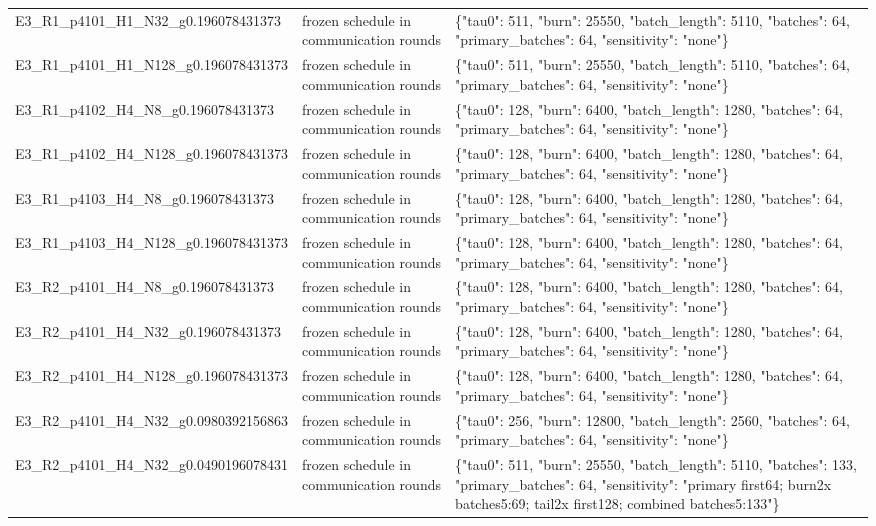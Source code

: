 \begin{tabular}{lll}
E3\_R1\_p4101\_H1\_N32\_g0.196078431373 & frozen schedule in communication rounds & \{"tau0": 511, "burn": 25550, "batch\_length": 5110, "batches": 64, "primary\_batches": 64, "sensitivity": "none"\} \\
E3\_R1\_p4101\_H1\_N128\_g0.196078431373 & frozen schedule in communication rounds & \{"tau0": 511, "burn": 25550, "batch\_length": 5110, "batches": 64, "primary\_batches": 64, "sensitivity": "none"\} \\
E3\_R1\_p4102\_H4\_N8\_g0.196078431373 & frozen schedule in communication rounds & \{"tau0": 128, "burn": 6400, "batch\_length": 1280, "batches": 64, "primary\_batches": 64, "sensitivity": "none"\} \\
E3\_R1\_p4102\_H4\_N128\_g0.196078431373 & frozen schedule in communication rounds & \{"tau0": 128, "burn": 6400, "batch\_length": 1280, "batches": 64, "primary\_batches": 64, "sensitivity": "none"\} \\
E3\_R1\_p4103\_H4\_N8\_g0.196078431373 & frozen schedule in communication rounds & \{"tau0": 128, "burn": 6400, "batch\_length": 1280, "batches": 64, "primary\_batches": 64, "sensitivity": "none"\} \\
E3\_R1\_p4103\_H4\_N128\_g0.196078431373 & frozen schedule in communication rounds & \{"tau0": 128, "burn": 6400, "batch\_length": 1280, "batches": 64, "primary\_batches": 64, "sensitivity": "none"\} \\
E3\_R2\_p4101\_H4\_N8\_g0.196078431373 & frozen schedule in communication rounds & \{"tau0": 128, "burn": 6400, "batch\_length": 1280, "batches": 64, "primary\_batches": 64, "sensitivity": "none"\} \\
E3\_R2\_p4101\_H4\_N32\_g0.196078431373 & frozen schedule in communication rounds & \{"tau0": 128, "burn": 6400, "batch\_length": 1280, "batches": 64, "primary\_batches": 64, "sensitivity": "none"\} \\
E3\_R2\_p4101\_H4\_N128\_g0.196078431373 & frozen schedule in communication rounds & \{"tau0": 128, "burn": 6400, "batch\_length": 1280, "batches": 64, "primary\_batches": 64, "sensitivity": "none"\} \\
E3\_R2\_p4101\_H4\_N32\_g0.0980392156863 & frozen schedule in communication rounds & \{"tau0": 256, "burn": 12800, "batch\_length": 2560, "batches": 64, "primary\_batches": 64, "sensitivity": "none"\} \\
E3\_R2\_p4101\_H4\_N32\_g0.0490196078431 & frozen schedule in communication rounds & \{"tau0": 511, "burn": 25550, "batch\_length": 5110, "batches": 133, "primary\_batches": 64, "sensitivity": "primary first64; burn2x batches5:69; tail2x first128; combined batches5:133"\} \\

\end{tabular}
